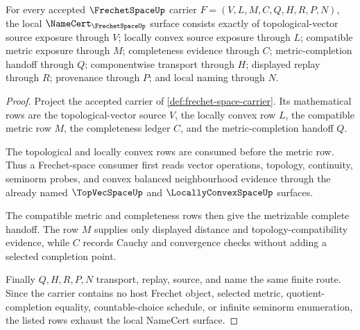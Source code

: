\begin{theorem}
\label{thm:frechet-space-namecert-obligations}
For every accepted $\FrechetSpaceUp$ carrier $F=(V,L,M,C,Q,H,R,P,N)$, the local $\NameCert_{\FrechetSpaceUp}$ surface consists exactly of topological-vector source exposure through $V$; locally convex source exposure through $L$; compatible metric exposure through $M$; completeness evidence through $C$; metric-completion handoff through $Q$; componentwise transport through $H$; displayed replay through $R$; provenance through $P$; and local naming through $N$.
\end{theorem}
\begin{proof}
Project the accepted carrier of \autoref{def:frechet-space-carrier}. Its mathematical rows are the topological-vector source $V$, the locally convex row $L$, the compatible metric row $M$, the completeness ledger $C$, and the metric-completion handoff $Q$.

The topological and locally convex rows are consumed before the metric row. Thus a Frechet-space consumer first reads vector operations, topology, continuity, seminorm probes, and convex balanced neighbourhood evidence through the already named $\TopVecSpaceUp$ and $\LocallyConvexSpaceUp$ surfaces.

The compatible metric and completeness rows then give the metrizable complete handoff. The row $M$ supplies only displayed distance and topology-compatibility evidence, while $C$ records Cauchy and convergence checks without adding a selected completion point.

Finally $Q,H,R,P,N$ transport, replay, source, and name the same finite route. Since the carrier contains no host Frechet object, selected metric, quotient-completion equality, countable-choice schedule, or infinite seminorm enumeration, the listed rows exhaust the local NameCert surface.
\end{proof}

